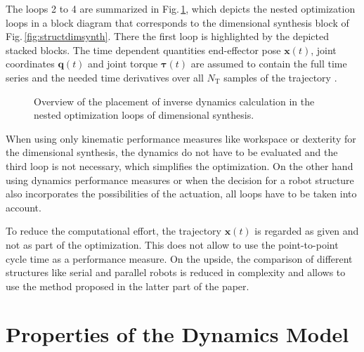 \documentclass{svproc}
\newcommand{\bm}[1]{\boldsymbol{#1}}
\begin{document}
The loops 2 to 4 are summarized in Fig.\,\ref{fig:dimsynth_dyn_std}, which depicts the nested optimization loops in a block diagram that corresponds to the dimensional synthesis block of Fig.\,\ref{fig:structdimsynth}.
There the first loop is highlighted by the depicted stacked blocks.
The time dependent quantities end-effector pose $\bm{x}(t)$, joint coordinates $\bm{q}(t)$ and joint torque $\bm{\tau}(t)$ are assumed to contain the full time series and the needed time derivatives over all $N_\mathrm{T}$ samples of the trajectory .

\begin{figure}[tb]
    
    \caption{Overview of the placement of inverse dynamics calculation in the nested optimization loops of dimensional synthesis.}
    \label{fig:dimsynth_dyn_std}
\end{figure} 

When using only kinematic performance measures like workspace or dexterity for the dimensional synthesis, the dynamics do not have to be evaluated and the third loop is not necessary, which simplifies the optimization.
On the other hand using dynamics performance measures or when the decision for a robot structure also incorporates the possibilities of the actuation, all loops have to be taken into account.

To reduce the computational effort, the trajectory $\bm{x}(t)$ is regarded as given and not as part of the optimization.
This does not allow to use the point-to-point cycle time as a performance measure.
On the upside, the comparison of different structures like serial and parallel robots is reduced in complexity and allows to use the method proposed in the latter part of the paper.



\section{Properties of the Dynamics Model}
\label{sec:DynMdl}
\end{document}
